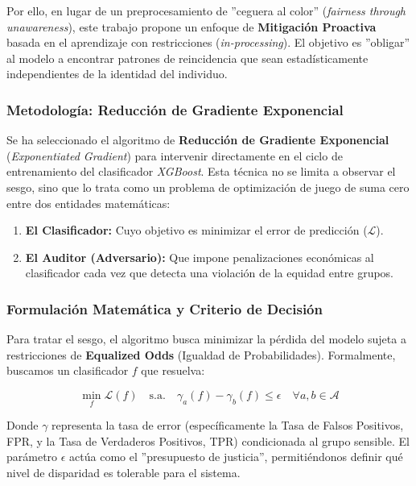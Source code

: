 \documentclass[11pt,a4paper]{article}
\begin{document}
Por ello, en lugar de un preprocesamiento de ''ceguera al color'' (\textit{fairness through unawareness}), este trabajo propone un enfoque de \textbf{Mitigación Proactiva} basada en el aprendizaje con restricciones (\textit{in-processing}). El objetivo es ''obligar'' al modelo a encontrar patrones de reincidencia que sean estadísticamente independientes de la identidad del individuo.

\subsubsection{Metodología: Reducción de Gradiente Exponencial}

Se ha seleccionado el algoritmo de \textbf{Reducción de Gradiente Exponencial} (\textit{Exponentiated Gradient}) para intervenir directamente en el ciclo de entrenamiento del clasificador \textit{XGBoost}. Esta técnica no se limita a observar el sesgo, sino que lo trata como un problema de optimización de juego de suma cero entre dos entidades matemáticas:

\begin{enumerate}
    \item \textbf{El Clasificador:} Cuyo objetivo es minimizar el error de predicción ($\mathcal{L}$).
    \item \textbf{El Auditor (Adversario):} Que impone penalizaciones económicas al clasificador cada vez que detecta una violación de la equidad entre grupos.
\end{enumerate}



\subsubsection{Formulación Matemática y Criterio de Decisión}

Para tratar el sesgo, el algoritmo busca minimizar la pérdida del modelo sujeta a restricciones de \textbf{Equalized Odds} (Igualdad de Probabilidades). Formalmente, buscamos un clasificador $f$ que resuelva:

\begin{equation}
    \min_{f} \mathcal{L}(f) \quad \text{s.a.} \quad \gamma_a(f) - \gamma_b(f) \leq \epsilon \quad \forall a,b \in \mathcal{A}
\end{equation}

Donde $\gamma$ representa la tasa de error (específicamente la Tasa de Falsos Positivos, FPR, y la Tasa de Verdaderos Positivos, TPR) condicionada al grupo sensible. El parámetro $\epsilon$ actúa como el ''presupuesto de justicia'', permitiéndonos definir qué nivel de disparidad es tolerable para el sistema. 
\end{document}

